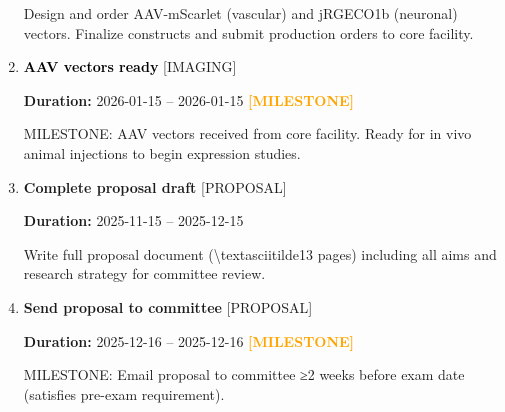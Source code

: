 \documentclass[landscape,a4paper]{article}
\begin{document}
\begin{enumerate}[leftmargin=1.5cm, itemsep=1em]
          \vspace{0.4em}
          \begin{minipage}[t]{0.9\textwidth}
          \textcolor{black!85}{Design and order AAV-mScarlet (vascular) and jRGECO1b (neuronal) vectors. Finalize constructs and submit production orders to core facility.}
          \end{minipage}


    \item \textcolor{black}{\textbf{\large AAV vectors ready}}
          \hfill \textcolor{black!60}{\small [IMAGING]}
          
          \vspace{0.2em}
          \textcolor{black!70}{\textbf{Duration:} 2026-01-15 -- 2026-01-15}
          \textcolor{orange}{\textbf{ [MILESTONE]}}\n
          \vspace{0.4em}
          \begin{minipage}[t]{0.9\textwidth}
          \textcolor{black!85}{MILESTONE: AAV vectors received from core facility. Ready for in vivo animal injections to begin expression studies.}
          \end{minipage}


    \item \textcolor{researchcore}{\textbf{\large Complete proposal draft}}
          \hfill \textcolor{black!60}{\small [PROPOSAL]}
          
          \vspace{0.2em}
          \textcolor{black!70}{\textbf{Duration:} 2025-11-15 -- 2025-12-15}

          \vspace{0.4em}
          \begin{minipage}[t]{0.9\textwidth}
          \textcolor{black!85}{Write full proposal document (\textbackslash{}textasciitilde{}13 pages) including all aims and research strategy for committee review.}
          \end{minipage}


    \item \textcolor{researchcore}{\textbf{\large Send proposal to committee}}
          \hfill \textcolor{black!60}{\small [PROPOSAL]}
          
          \vspace{0.2em}
          \textcolor{black!70}{\textbf{Duration:} 2025-12-16 -- 2025-12-16}
          \textcolor{orange}{\textbf{ [MILESTONE]}}\n
          \vspace{0.4em}
          \begin{minipage}[t]{0.9\textwidth}
          \textcolor{black!85}{MILESTONE: Email proposal to committee ≥2 weeks before exam date (satisfies pre-exam requirement).}
          \end{minipage}



\end{enumerate}
\end{document}
